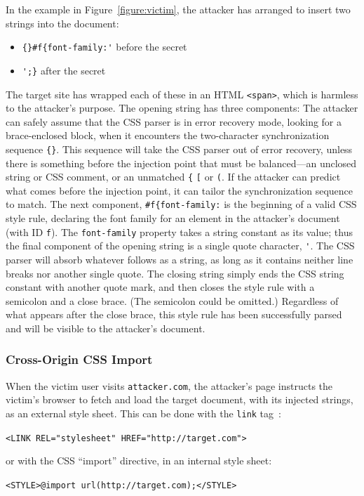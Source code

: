 \documentclass{acm_proc_article-sp}
\begin{document}
In the example in Figure~\ref{figure:victim}, the attacker has
arranged to insert two strings into the document:
\begin{itemize}
\item \verb|{}#f{font-family:'| before the secret
\item \verb|';}| after the secret
\end{itemize}
The target site has wrapped each of these in an HTML \verb|<span>|,
which is harmless to the attacker's purpose.  The opening string has
three components: The attacker can safely assume that the CSS parser
is in error recovery mode, looking for a brace-enclosed block, when it
encounters the two-character synchronization sequence \verb|{}|.  This
sequence will take the CSS parser out of error recovery, unless there
is something before the injection point that must be balanced---an
unclosed string or CSS comment, or an unmatched \verb|{| \verb|[| or
\verb|(|.  If the attacker can predict what comes before the injection
point, it can tailor the synchronization sequence to match.  The next
component, \verb|#f{font-family:| is the beginning of a valid CSS
style rule, declaring the font family for an element in the attacker's
document (with ID \texttt{f}). The \texttt{font-family} property
takes a string constant as its value; thus the final component of the
opening string is a single quote character, \verb|'|.  The CSS parser
will absorb whatever follows as a string, as long as it contains
neither line breaks nor another single quote.
The closing string simply ends the CSS string constant with another
quote mark, and then closes the style rule with a semicolon and a
close brace.  (The semicolon could be omitted.)  Regardless of what
appears after the close brace, this style rule has been successfully
parsed and will be visible to the attacker's document.

\subsubsection{Cross-Origin CSS Import}
When the victim user visits \texttt{attacker.com}, the attacker's page
instructs the victim's browser to fetch and load the target document,
with its injected strings, as an external style sheet.  This can be
done with the \texttt{link} tag~\cite{html}:

\verb|<LINK REL="stylesheet" HREF="http://target.com">|

or with the CSS “import” directive, in an internal style sheet:

\verb|<STYLE>@import url(http://target.com);</STYLE>|
\end{document}
